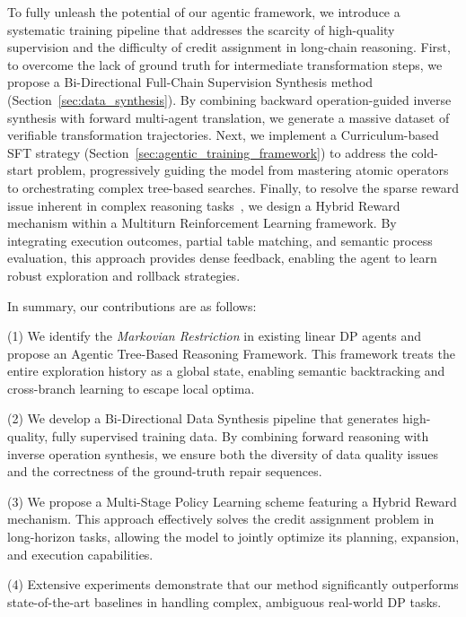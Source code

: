 To fully unleash the potential of our agentic framework, we introduce a systematic training pipeline that addresses the scarcity of high-quality supervision and the difficulty of credit assignment in long-chain reasoning.
First, to overcome the lack of ground truth for intermediate transformation steps, we propose a Bi-Directional Full-Chain Supervision Synthesis method (Section~\ref{sec:data_synthesis}). By combining backward operation-guided inverse synthesis with forward multi-agent translation, we generate a massive dataset of verifiable transformation trajectories.
Next, we implement a Curriculum-based SFT strategy (Section~\ref{sec:agentic_training_framework}) to address the cold-start problem, progressively guiding the model from mastering atomic operators to orchestrating complex tree-based searches.
Finally, to resolve the sparse reward issue inherent in complex reasoning tasks~\cite{shi2025mutual}, we design a Hybrid Reward mechanism within a Multiturn Reinforcement Learning framework. By integrating execution outcomes, partial table matching, and semantic process evaluation, this approach provides dense feedback, enabling the agent to learn robust exploration and rollback strategies.

In summary, our contributions are as follows:

(1) We identify the \textit{Markovian Restriction} in existing linear DP agents and propose an Agentic Tree-Based Reasoning Framework. This framework treats the entire exploration history as a global state, enabling semantic backtracking and cross-branch learning to escape local optima.

(2) We develop a Bi-Directional Data Synthesis pipeline that generates high-quality, fully supervised training data. By combining forward reasoning with inverse operation synthesis, we ensure both the diversity of data quality issues and the correctness of the ground-truth repair sequences.

(3) We propose a Multi-Stage Policy Learning scheme featuring a Hybrid Reward mechanism. This approach effectively solves the credit assignment problem in long-horizon tasks, allowing the model to jointly optimize its planning, expansion, and execution capabilities.

(4) Extensive experiments demonstrate that our method significantly outperforms state-of-the-art baselines in handling complex, ambiguous real-world DP tasks.
